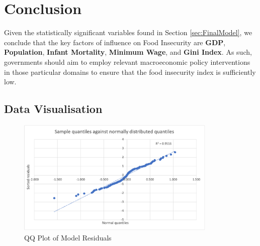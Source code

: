 \documentclass{article}
\begin{document}
\section{Conclusion}
Given the statistically significant variables found in Section \ref{sec:FinalModel}, we conclude that the key factors of influence on Food Insecurity are \textbf{GDP}, \textbf{Population}, \textbf{Infant Mortality}, \textbf{Minimum Wage}, and \textbf{Gini Index}. As such, governments should aim to employ relevant macroeconomic policy interventions in those particular domains to ensure that the food insecurity index is sufficiently low. 

\newpage
\clearpage
{}
\begin{appendices}

\section{Data Visualisation}\label{AppA}

\begin{figure}[H]
    \centering
    \includegraphics[width=0.85\textwidth]{Images/QQplot.png}
    \caption{QQ Plot of Model Residuals}
    \label{fig:qqplotresid}
\end{figure}


\end{appendices}
\end{document}

